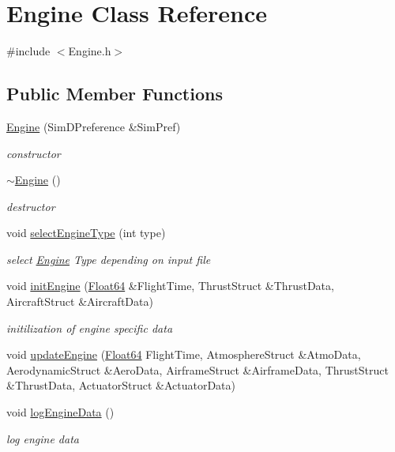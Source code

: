 \hypertarget{class_engine}{}\section{Engine Class Reference}
\label{class_engine}


{\ttfamily \#include $<$Engine.\+h$>$}

\subsection*{Public Member Functions}
\begin{DoxyCompactItemize}
\item 
\hyperlink{class_engine_ae305df3b4dd35fb05faa6a706155dcba}{Engine} (Sim\+D\+Preference \&Sim\+Pref)
\begin{DoxyCompactList}\small\item\em constructor \end{DoxyCompactList}\item 
\hyperlink{class_engine_a8ef7030a089ecb30bbfcb9e43094717a}{$\sim$\+Engine} ()
\begin{DoxyCompactList}\small\item\em destructor \end{DoxyCompactList}\item 
void \hyperlink{class_engine_ac33371d6fff86c0c8e14495f10046d9a}{select\+Engine\+Type} (int type)
\begin{DoxyCompactList}\small\item\em select \hyperlink{class_engine}{Engine} Type depending on input file \end{DoxyCompactList}\item 
void \hyperlink{class_engine_aaedb0350476c1aa67dd861be861ccd17}{init\+Engine} (\hyperlink{group___tools_ga3f1431cb9f76da10f59246d1d743dc2c}{Float64} \&Flight\+Time, Thrust\+Struct \&Thrust\+Data, Aircraft\+Struct \&Aircraft\+Data)
\begin{DoxyCompactList}\small\item\em initilization of engine specific data \end{DoxyCompactList}\item 
void \hyperlink{class_engine_a187c605d94ef94c34c046619ca5e0991}{update\+Engine} (\hyperlink{group___tools_ga3f1431cb9f76da10f59246d1d743dc2c}{Float64} Flight\+Time, Atmosphere\+Struct \&Atmo\+Data, Aerodynamic\+Struct \&Aero\+Data, Airframe\+Struct \&Airframe\+Data, Thrust\+Struct \&Thrust\+Data, Actuator\+Struct \&Actuator\+Data)
\item 
void \hyperlink{class_engine_aba52c5321b55dfca788038940cab5f08}{log\+Engine\+Data} ()
\begin{DoxyCompactList}\small\item\em log engine data \end{DoxyCompactList}\end{DoxyCompactItemize}


